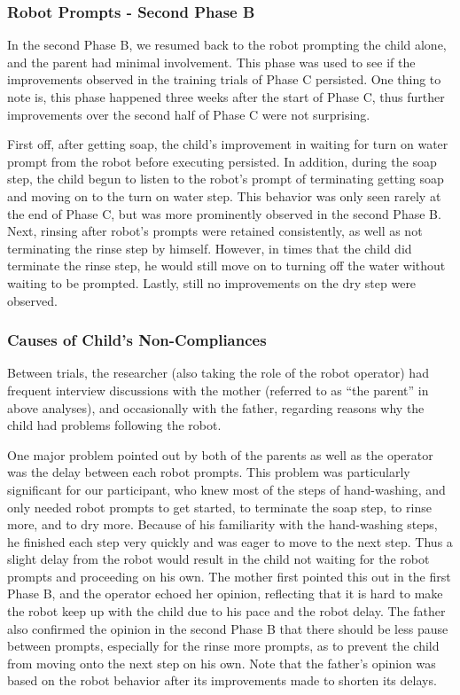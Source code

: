 \subsubsection{Robot Prompts - Second Phase B}
In the second Phase B, we resumed back to the robot prompting the child alone, and the parent had minimal involvement.  This phase was used to see if the improvements observed in the training trials of Phase C persisted.  One thing to note is, this phase happened three weeks after the start of Phase C, thus further improvements over the second half of Phase C were not surprising.

First off, after getting soap, the child's improvement in waiting for turn on water prompt from the robot before executing persisted.  In addition, during the soap step, the child begun to listen to the robot's prompt of terminating getting soap and moving on to the turn on water step.  This behavior was only seen rarely at the end of Phase C, but was more prominently observed in the second Phase B.  Next, rinsing after robot's prompts were retained consistently, as well as not terminating the rinse step by himself.  However, in times that the child did terminate the rinse step, he would still move on to turning off the water without waiting to be prompted.  Lastly, still no improvements on the dry step were observed.

\subsubsection{Causes of Child's Non-Compliances}
Between trials, the researcher (also taking the role of the robot operator) had frequent interview discussions with the mother (referred to as ``the parent'' in above analyses), and occasionally with the father, regarding reasons why the child had problems following the robot.

One major problem pointed out by both of the parents as well as the operator was the delay between each robot prompts.  This problem was particularly significant for our participant, who knew most of the steps of hand-washing, and only needed robot prompts to get started, to terminate the soap step, to rinse more, and to dry more.  Because of his familiarity with the hand-washing steps, he finished each step very quickly and was eager to move to the next step.  Thus a slight delay from the robot would result in the child not waiting for the robot prompts and proceeding on his own.  The mother first pointed this out in the first Phase B, and the operator echoed her opinion, reflecting that it is hard to make the robot keep up with the child due to his pace and the robot delay.  The father also confirmed the opinion in the second Phase B that there should be less pause between prompts, especially for the rinse more prompts, as to prevent the child from moving onto the next step on his own.  Note that the father's opinion was based on the robot behavior after its improvements made to shorten its delays.

